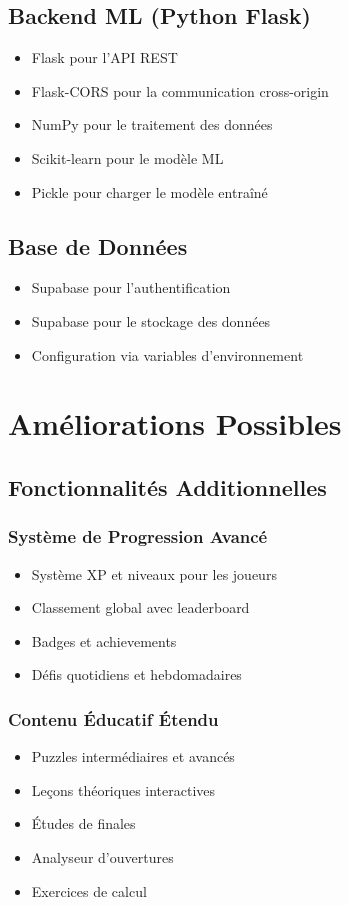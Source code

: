 \documentclass[a4paper,12pt]{article}
\begin{document}
\subsection{Backend ML (Python Flask)}
\begin{itemize}
    \item Flask pour l'API REST
    \item Flask-CORS pour la communication cross-origin
    \item NumPy pour le traitement des données
    \item Scikit-learn pour le modèle ML
    \item Pickle pour charger le modèle entraîné
\end{itemize}

\subsection{Base de Données}
\begin{itemize}
    \item Supabase pour l'authentification
    \item Supabase pour le stockage des données
    \item Configuration via variables d'environnement
\end{itemize}

\section{Améliorations Possibles}

\subsection{Fonctionnalités Additionnelles}

\subsubsection{Système de Progression Avancé}
\begin{itemize}
    \item Système XP et niveaux pour les joueurs
    \item Classement global avec leaderboard
    \item Badges et achievements
    \item Défis quotidiens et hebdomadaires
\end{itemize}

\subsubsection{Contenu Éducatif Étendu}
\begin{itemize}
    \item Puzzles intermédiaires et avancés
    \item Leçons théoriques interactives
    \item Études de finales
    \item Analyseur d'ouvertures
    \item Exercices de calcul
\end{itemize}
\end{document}
